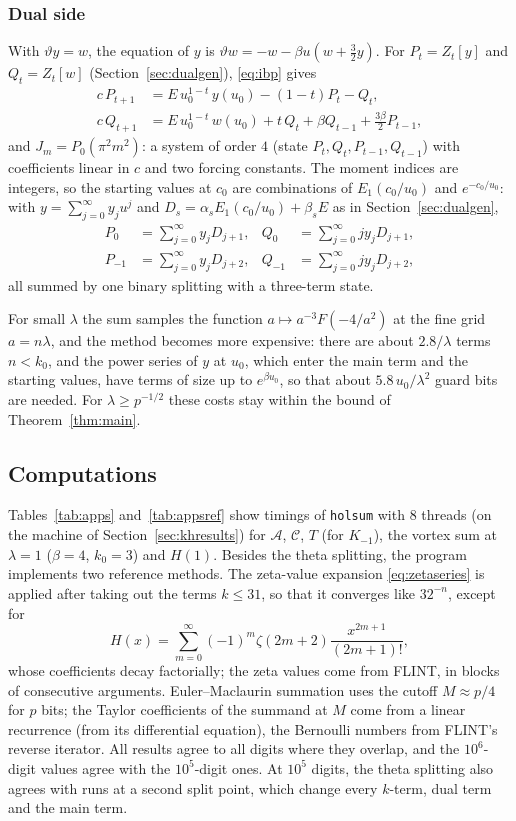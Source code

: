 \documentclass[11pt,reqno]{amsart}
\theoremstyle{definition}
\theoremstyle{remark}
\begin{document}
\subsubsection{Dual side} With $\vartheta y = w$, the equation of $y$ is $\vartheta w = -w - \beta u(w + \frac32 y)$. For
$P_t = Z_t[y]$ and $Q_t = Z_t[w]$ (Section~\ref{sec:dualgen}), \eqref{eq:ibp} gives
\begin{align*}
  c\,P_{t+1} &= E\,u_0^{1-t}\,y(u_0) - (1-t)P_t - Q_t, \\
  c\,Q_{t+1} &= E\,u_0^{1-t}\,w(u_0) + t\,Q_t + \beta Q_{t-1} + \tfrac{3\beta}{2}P_{t-1},
\end{align*}
and $J_m = P_0(\pi^2m^2)$: a system of order $4$ (state $P_t, Q_t, P_{t-1}, Q_{t-1}$) with coefficients linear in $c$ and
two forcing constants. The moment indices are integers, so the starting values at $c_0$ are combinations of
$E_1(c_0/u_0)$ and $e^{-c_0/u_0}$: with $y = \sum_{j=0}^{\infty}y_ju^j$ and $D_s = \alpha_sE_1(c_0/u_0) + \beta_sE$ as in
Section~\ref{sec:dualgen},
\begin{align*}
  P_0 &= \sum_{j=0}^{\infty}y_jD_{j+1}, & Q_0 &= \sum_{j=0}^{\infty} jy_jD_{j+1}, \\
  P_{-1} &= \sum_{j=0}^{\infty}y_jD_{j+2}, & Q_{-1} &= \sum_{j=0}^{\infty}jy_jD_{j+2},
\end{align*}
all summed by one binary splitting with a three-term state.

For small $\lambda$ the sum samples the function $a \mapsto a^{-3}F(-4/a^2)$ at the fine grid $a = n\lambda$, and the method
becomes more expensive: there are about $2.8/\lambda$ terms $n < k_0$, and the power series of $y$ at $u_0$, which
enter the main term and the starting values, have terms of size up to $e^{\beta u_0}$, so that about $5.8\,u_0/\lambda^2$ guard
bits are needed. For $\lambda \ge p^{-1/2}$ these costs stay within the bound of Theorem~\ref{thm:main}.

\subsection{Computations}\label{sec:appcomp}
Tables~\ref{tab:apps} and~\ref{tab:appsref} show timings of \texttt{holsum} with $8$ threads (on the machine of
Section~\ref{sec:khresults}) for $\mathcal A$, $\mathcal C$, $T$ (for $K_{-1}$), the vortex sum at $\lambda = 1$
($\beta = 4$, $k_0 = 3$) and $H(1)$. Besides the theta splitting, the program implements two reference methods. The
zeta-value expansion \eqref{eq:zetaseries} is applied after taking out the terms $k \le 31$, so that it converges
like $32^{-n}$, except for
\[
  H(x) = \sum_{m=0}^{\infty}(-1)^m\zeta(2m+2)\frac{x^{2m+1}}{(2m+1)!},
\]
whose coefficients decay factorially; the zeta values come from FLINT, in blocks of consecutive arguments. Euler--Maclaurin summation uses the
cutoff $M \approx p/4$ for $p$ bits; the Taylor coefficients of the summand at $M$ come from a linear recurrence (from
its differential equation), the Bernoulli numbers from FLINT's reverse iterator. All results agree to all digits
where they overlap, and the $10^6$-digit values agree with the $10^5$-digit ones. At $10^5$ digits, the theta
splitting also agrees with runs at a second split point, which change every $k$-term, dual term and the main term.
\end{document}
